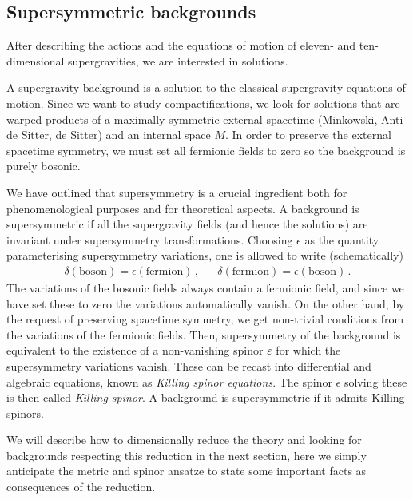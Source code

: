 \documentclass[debug]{phd}
\begin{document}

			\subsection{Supersymmetric backgrounds}
				After describing the actions and the equations of motion of eleven- and ten-dimensional supergravities, we are interested in solutions.
				
				A supergravity background is a solution to the classical supergravity equations of motion.
				Since we want to study compactifications, we look for solutions that are warped products of a maximally symmetric external spacetime (Minkowski, Anti-de Sitter, de Sitter) and an internal space $M$.
				In order to preserve the external spacetime symmetry, we must set all fermionic fields to zero so the background is purely bosonic.
				
				We have outlined that supersymmetry is a crucial ingredient both for phenomenological purposes and for theoretical aspects. 
				A background is supersymmetric if all the supergravity fields (and hence the solutions) are invariant under supersymmetry transformations.
				Choosing $\epsilon$ as the quantity parameterising supersymmetry variations, one is allowed to write (schematically)
						\begin{align}\label{susyvar}
							& &	\delta(\text{boson}) = \epsilon (\text{fermion})\, ,	& &	\delta(\text{fermion}) = \epsilon (\text{boson})\, .	& &
						\end{align}
				The variations of the bosonic fields always contain a fermionic field, and since we have set these to zero the variations automatically vanish.
				On the other hand, by the request of preserving spacetime symmetry, we get non-trivial conditions from the variations of the fermionic fields. 
				Then, supersymmetry of the background is equivalent to the existence of a non-vanishing spinor $\varepsilon$ for which the supersymmetry variations vanish.
				These can be recast into differential and algebraic equations, known as \emph{Killing spinor equations}.
				The spinor $\epsilon$ solving these is then called \emph{Killing spinor}.
				A background is supersymmetric if it admits Killing spinors.
				
				We will describe how to dimensionally reduce the theory and looking for backgrounds respecting this reduction in the next section, here we simply anticipate the metric and spinor ansatze to state some important facts as consequences of the reduction.
				
\end{document}
